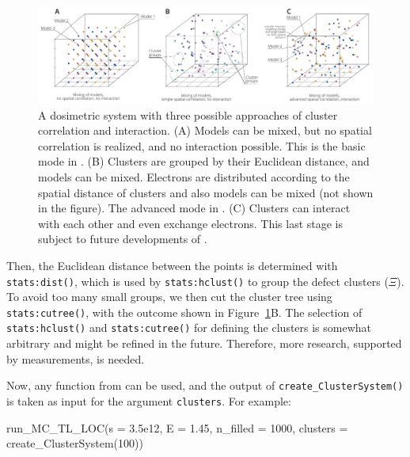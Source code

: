 \begin{figure}[h]
\begin{center}
\includegraphics[width=1\textwidth]{figures/Fig6-1.pdf}
\caption{A dosimetric system with three possible approaches of cluster 
correlation and interaction. (A) Models can be mixed, but no spatial correlation 
is realized, and no interaction possible. This is the basic mode in . 
(B) Clusters are grouped by their Euclidean distance, and models can be mixed. Electrons
are distributed according to the spatial distance of clusters and also models
can be mixed (not shown in the figure). The advanced mode in . 
(C) Clusters can interact with each other and even exchange electrons. This last 
stage is subject to future developments of .}
\label{fig:Fig6}
\end{center}
\end{figure}

Then, the Euclidean distance between the points is determined with
\texttt{stats:dist()}, which is used by \texttt{stats:hclust()} to group
the defect clusters (\(\Xi\)). To avoid too many small groups, we then
cut the cluster tree using \texttt{stats:cutree()}, with the outcome
shown in Figure\(~\) \ref{fig:Fig6}B. The selection of
\texttt{stats:hclust()} and \texttt{stats:cutree()} for defining the
clusters is somewhat arbitrary and might be refined in the future.
Therefore, more research, supported by measurements, is needed.

Now, any function from  can be used, and the output of
\texttt{create\_ClusterSystem()} is taken as input for the argument
\texttt{clusters}. For example:

\begin{Schunk}
\begin{Sinput}
run_MC_TL_LOC(s = 3.5e12, E = 1.45, n_filled = 1000,
  clusters = create_ClusterSystem(100))
\end{Sinput}
\end{Schunk}

